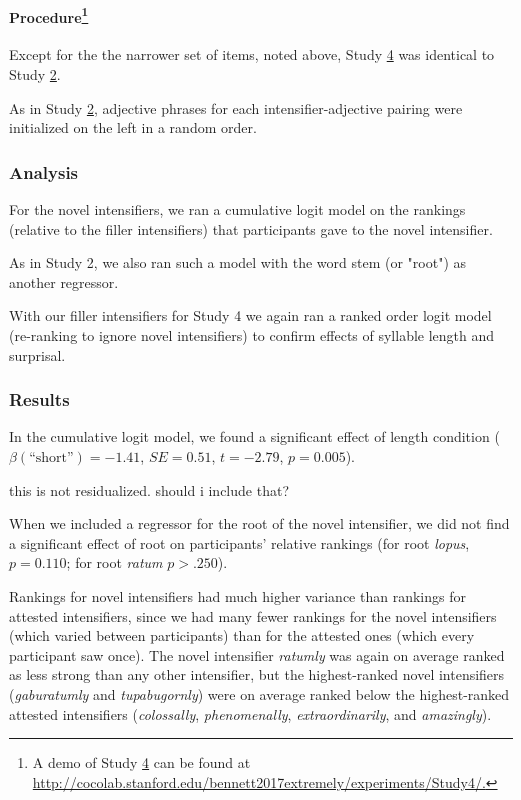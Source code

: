 \documentclass[10pt,letterpaper]{article}
\newcommand{\w}[1]{\emph{#1}}
\newcommand{\todo}[1]{{\color{red}#1}}
\begin{document}
\paragraph{Procedure\footnote{A demo of Study \hyperref[sec:study4]{4} can be found at \url{http://cocolab.stanford.edu/bennett2017extremely/experiments/Study4/.}}}

Except for the the narrower set of items, noted above, Study \hyperref[sec:study4]{4} was identical to Study \hyperref[sec:study2]{2}. 

As in Study \hyperref[sec:study2]{2}, adjective phrases for each intensifier-adjective pairing were initialized on the left in a random order.

\subsubsection{Analysis}

For the novel intensifiers, we ran a cumulative logit model on the rankings (relative to the filler intensifiers) that participants gave to the novel intensifier.

As in Study 2, we also ran such a model with the word stem (or "root") as another regressor.

With our filler intensifiers for Study 4 we again ran a ranked order logit model (re-ranking to ignore novel intensifiers) to confirm effects of syllable length and surprisal.

\subsubsection{Results}

In the cumulative logit model, we found a significant effect of length condition ($\beta(\mbox{``short''})=-1.41$, $SE=0.51$, $t=-2.79$, $p=0.005$).

\todo{this is not residualized. should i include that?}

When we included a regressor for the root of the novel intensifier, we did not find a significant effect of root on participants' relative rankings (for root \w{lopus}, $p=0.110$; for root \w{ratum} $p>.250$).

Rankings for novel intensifiers had much higher variance than rankings for attested intensifiers, since we had many fewer rankings for the novel intensifiers (which varied between participants) than for the attested ones (which every participant saw once). The novel intensifier \w{ratumly} was again on average ranked as less strong than any other intensifier, but the highest-ranked novel intensifiers (\w{gaburatumly} and \w{tupabugornly}) were on average ranked below the highest-ranked attested intensifiers (\w{colossally}, \w{phenomenally}, \w{extraordinarily}, and \w{amazingly}).
\end{document}
